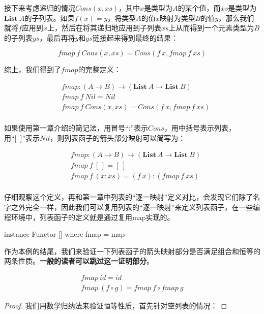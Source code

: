 \documentclass[b5paper]{ctexart}
\begin{document}
\begin{example}
接下来考虑递归的情况$Cons(x, xs)$，其中$x$是类型为$A$的某个值，而$xs$是类型为$\mathbf{List}\ A$的子列表。如果$f(x) = y$，将类型$A$的值$x$映射为类型$B$的值$y$，那么我们就将$f$应用到$x$上，然后在将其递归地应用到子列表$xs$上从而得到一个元素类型为$B$的子列表$ys$，最后再将$y$和$ys$链接起来得到最终的结果：

\[
fmap\ f\ Cons(x, xs) = Cons(f\ x, fmap\ f\ xs)
\]

综上，我们得到了$fmap$的完整定义：

\[
\begin{array}{l}
\quad    fmap : (A \to B) \to (\mathbf{List}\ A \to \mathbf{List}\ B) \\
\quad    fmap\ f\ Nil = Nil \\
\quad    fmap\ f\ Cons(x, xs) = Cons(f\ x, fmap\ f\ xs) \\
\end{array}
\]

如果使用第一章介绍的简记法，用冒号“:”表示$Cons$，用中括号表示列表，用“[\ ]”表示$Nil$，则列表函子的箭头部分映射可以简写为：

\[
\begin{array}{l}
\quad    fmap : (A \to B) \to (\mathbf{List}\ A \to \mathbf{List}\ B) \\
\quad    fmap\ f\ [\ ] = [\ ] \\
\quad    fmap\ f\ (x:xs) = (f\ x):(fmap\ f\ xs) \\
\end{array}
\]

仔细观察这个定义，再和第一章中列表的“逐一映射”定义对比，会发现它们除了名字之外完全一样，因此我们可以复用列表的“逐一映射”来定义列表函子，在一些编程环境中，列表函子的定义就是通过复用map实现的。

\lstset{frame=single}
\begin{Haskell}
instance Functor [] where
    fmap = map
\end{Haskell}

作为本例的结尾，我们来验证一下列表函子的箭头映射部分是否满足组合和恒等的两条性质。\textbf{一般的读者可以跳过这一证明部分}。

\begin{mdframed}
\[
\begin{array}{l}
fmap\ id = id \\
fmap\ (f \circ g) = fmap\ f \circ fmap\ g
\end{array}
\]

\begin{proof}
我们用数学归纳法来验证恒等性质，首先针对空列表的情况：


\end{proof}
\end{mdframed}
\end{example}
\end{document}
